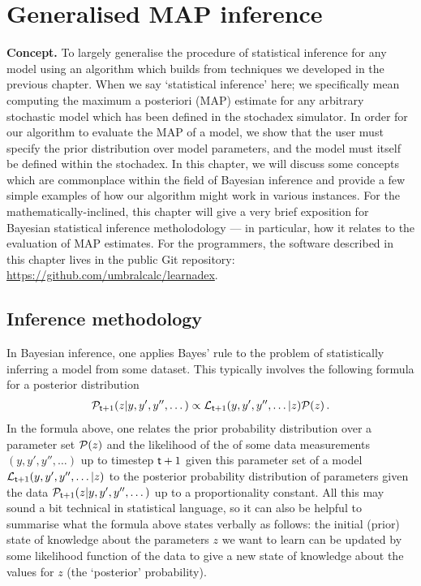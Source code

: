 \chapter{\sffamily Generalised MAP inference}

{\bfseries\sffamily Concept.} To largely generalise the procedure of statistical inference for any model using an algorithm which builds from techniques we developed in the previous chapter. When we say `statistical inference' here; we specifically mean computing the maximum a posteriori (MAP) estimate for any arbitrary stochastic model which has been defined in the stochadex simulator. In order for our algorithm to evaluate the MAP of a model, we show that the user must specify the prior distribution over model parameters, and the model must itself be defined within the stochadex. In this chapter, we will discuss some concepts which are commonplace within the field of Bayesian inference and provide a few simple examples of how our algorithm might work in various instances. For the mathematically-inclined, this chapter will give a very brief exposition for Bayesian statistical inference metholodology --- in particular, how it relates to the evaluation of MAP estimates. For the programmers, the software described in this chapter lives in the public Git repository: \href{https://github.com/umbralcalc/learnadex}{https://github.com/umbralcalc/learnadex}.


\section{\sffamily Inference methodology}

In Bayesian inference, one applies Bayes' rule to the problem of statistically inferring a model from some dataset. This typically involves the following formula for a posterior distribution
\begin{align}
{\cal P}_{{\sf t}+1}(z \vert y, y', y'', \dots) \propto {\cal L}_{{\sf t}+1}(y, y', y'', \dots\vert z){\cal P} (z) \label{eq:bayes-rule} \,.
\end{align}
In the formula above, one relates the prior probability distribution over a parameter set ${\cal P} (z)$ and the likelihood of the of some data measurements $(y, y', y'', \dots)$  up to timestep ${\sf t}+1$ given this parameter set of a model ${\cal L}_{{\sf t}+1}(y, y', y'', \dots \vert z)$ to the posterior probability distribution of parameters given the data ${\cal P}_{{\sf t}+1}(z \vert y, y', y'', \dots)$ up to a proportionality constant. All this may sound a bit technical in statistical language, so it can also be helpful to summarise what the formula above states verbally as follows: the initial (prior) state of knowledge about the parameters $z$ we want to learn can be updated by some likelihood function of the data to give a new state of knowledge about the values for $z$ (the `posterior' probability). 

